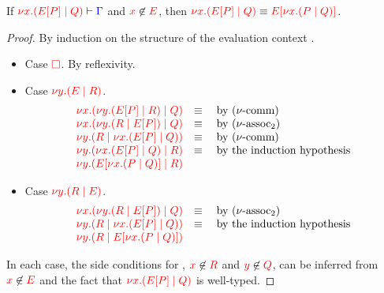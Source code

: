 \begin{lemmaB}\label{thm:cp-display-cut-1}
  If $\seq[{ \tm{\cpCut{x}{\cpPlug{E}{P}}{Q}} }]{ \Gamma }$ and
  $\notFreeIn{x}{E}$, then $\tm{\cpCut{x}{\cpPlug{E}{P}}{Q}} \equiv
  \tm{\cpPlug{E}{\cpCut{x}{P}{Q}}}$. 
\end{lemmaB}
  \begin{proof}
    By induction on the structure of the evaluation context .
    \begin{itemize}
    \item
      Case $\tm{\Box}$. By reflexivity.
    \item
      Case $\tm{\cpCut{y}{E}{R}}$.
      \[\!
        \begin{array}{ll}
          \tm{\cpCut{x}{\cpCut{y}{\cpPlug{E}{P}}{R}}{Q}} & \equiv \quad \text{by \cpEquivCutComm}\\
          \tm{\cpCut{x}{\cpCut{y}{R}{\cpPlug{E}{P}}}{Q}} & \equiv \quad \text{by \cpEquivCutAss2}\\
          \tm{\cpCut{y}{R}{\cpCut{x}{\cpPlug{E}{P}}{Q}}} & \equiv \quad \text{by \cpEquivCutComm}\\
          \tm{\cpCut{y}{\cpCut{x}{\cpPlug{E}{P}}{Q}}{R}} & \equiv \quad \text{by the induction hypothesis}\\ 
          \tm{\cpCut{y}{\cpPlug{E}{\cpCut{x}{P}{Q}}}{R}} &
        \end{array}
      \]
    \item
      Case $\tm{\cpCut{y}{R}{E}}$.
      \[\!
        \begin{array}{ll}
          \tm{\cpCut{x}{\cpCut{y}{R}{\cpPlug{E}{P}}}{Q}} & \equiv \quad \text{by \cpEquivCutAss2}\\
          \tm{\cpCut{y}{R}{\cpCut{x}{\cpPlug{E}{P}}{Q}}} & \equiv \quad \text{by the induction hypothesis}\\
          \tm{\cpCut{y}{R}{\cpPlug{E}{\cpCut{x}{P}{Q}}}}
        \end{array}
      \]
    \end{itemize}
    In each case, the side conditions for , $\notFreeIn{x}{R}$ and
    $\notFreeIn{y}{Q}$, can be inferred from $\notFreeIn{x}{E}$ and the fact that
    $\tm{\cpCut{x}{\cpPlug{E}{P}}{Q}}$ is well-typed.
  \end{proof}
